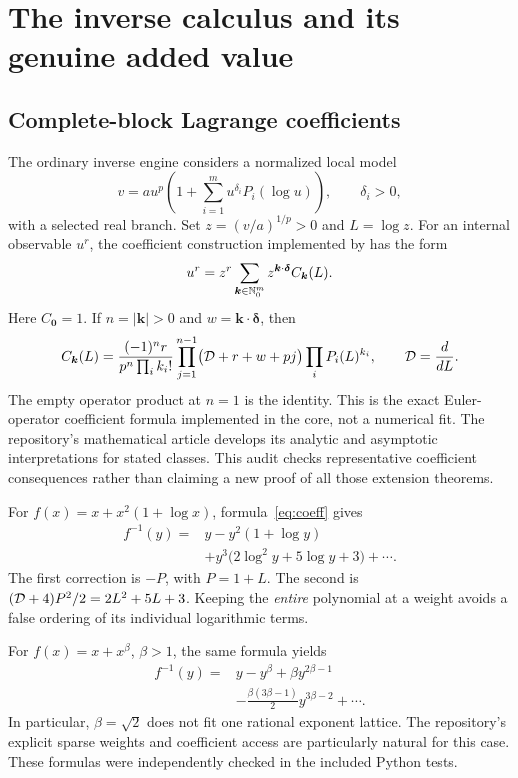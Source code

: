 \section{The inverse calculus and its genuine added value}

\subsection{Complete-block Lagrange coefficients}

The ordinary inverse engine considers a normalized local model
\begin{equation}\label{eq:model}
 v=a u^p\left(1+\sum_{i=1}^m u^{\delta_i}P_i(\log u)\right),
 \qquad \delta_i>0,
\end{equation}
with a selected real branch. Set $z=(v/a)^{1/p}>0$ and $L=\log z$. For an internal observable $u^r$, the coefficient construction implemented by  has the form
\begin{equation}\label{eq:inv}
 u^r=z^r\sum_{\boldsymbol k\in\mathbb N_0^m}
             z^{\boldsymbol k\cdot\boldsymbol\delta}
             C_{\boldsymbol k}(L).
\end{equation}
Here $C_{\boldsymbol0}=1$. If $n=|\boldsymbol k|>0$ and $w=\boldsymbol k\cdot\boldsymbol\delta$, then
\begin{equation}\label{eq:coeff}
 C_{\boldsymbol k}(L)=
 \frac{(-1)^n r}{p^n\prod_i k_i!}
 \prod_{j=1}^{n-1}\bigl(\mathcal D+r+w+pj\bigr)
 \prod_iP_i(L)^{k_i},\qquad \mathcal D=\frac{d}{dL}.
\end{equation}
The empty operator product at $n=1$ is the identity. This is the exact Euler-operator coefficient formula implemented in the core, not a numerical fit. The repository's mathematical article develops its analytic and asymptotic interpretations for stated classes. This audit checks representative coefficient consequences rather than claiming a new proof of all those extension theorems.\cite{core,article}

For $f(x)=x+x^2(1+\log x)$, formula~\eqref{eq:coeff} gives
\begin{align*}
 f^{-1}(y)={}&y-y^2(1+\log y)\\
 &+y^3\bigl(2\log^2y+5\log y+3\bigr)+\cdots.
\end{align*}
The first correction is $-P$, with $P=1+L$. The second is
$(\mathcal D+4)P^2/2=2L^2+5L+3$. Keeping the \emph{entire} polynomial at a weight avoids a false ordering of its individual logarithmic terms.

For $f(x)=x+x^\beta$, $\beta>1$, the same formula yields
\begin{align*}
 f^{-1}(y)={}&y-y^\beta+\beta y^{2\beta-1}\\
 &-\frac{\beta(3\beta-1)}2y^{3\beta-2}+\cdots.
\end{align*}
In particular, $\beta=\sqrt2$ does not fit one rational exponent lattice. The repository's explicit sparse weights and coefficient access are particularly natural for this case. These formulas were independently checked in the included Python tests.

